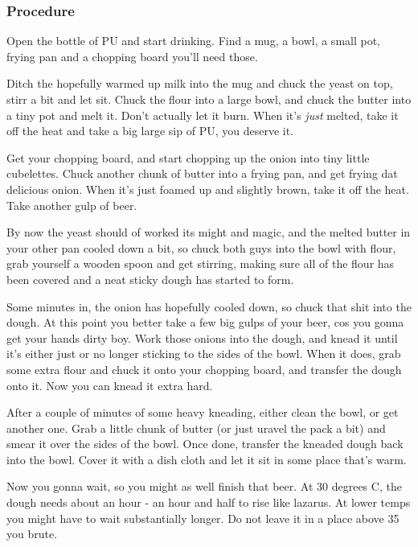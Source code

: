 \documentclass[10pt]{article}
\begin{document}
\subsubsection{Procedure}%
\label{ssub:czech_bread_procedure}

Open the bottle of PU and start drinking. Find a mug, a bowl, a small pot, frying pan and a chopping board you'll need those.\par

Ditch the hopefully warmed up milk into the mug and chuck the yeast on top, stirr a bit and let sit. Chuck the flour into a large bowl, and chuck the butter into a tiny pot and melt it. Don't actually let it burn. When it's \textit{just} melted, take it off the heat and take a big large sip of PU, you deserve it.\par

Get your chopping board, and start chopping up the onion into tiny little cubelettes. Chuck another chunk of butter into a frying pan, and get frying dat delicious onion. When it's just foamed up and slightly brown, take it off the heat. Take another gulp of beer.\par

By now the yeast should of worked its might and magic, and the melted butter in your other pan cooled down a bit, so chuck both guys into the bowl with flour, grab yourself a wooden spoon and get stirring, making sure all of the flour has been covered and a neat sticky dough has started to form.\par

Some minutes in, the onion has hopefully cooled down, so chuck that shit into the dough. At this point you better take a few big gulps of your beer, cos you gonna get your hands dirty boy. Work those onions into the dough, and knead it until it's either just or no longer sticking to the sides of the bowl. When it does, grab some extra flour and chuck it onto your chopping board, and transfer the dough onto it. Now you can knead it extra hard.\par

After a couple of minutes of some heavy kneading, either clean the bowl, or get another one. Grab a little chunk of butter (or just uravel the pack a bit) and smear it over the sides of the bowl. Once done, transfer the kneaded dough back into the bowl. Cover it with a dish cloth and let it sit in some place that's warm.\par

Now you gonna wait, so you might as well finish that beer. At 30 degrees C, the dough needs about an hour - an hour and half to rise like lazarus. At lower temps you might have to wait substantially longer. Do not leave it in a place above 35 you brute.\par
\end{document}
